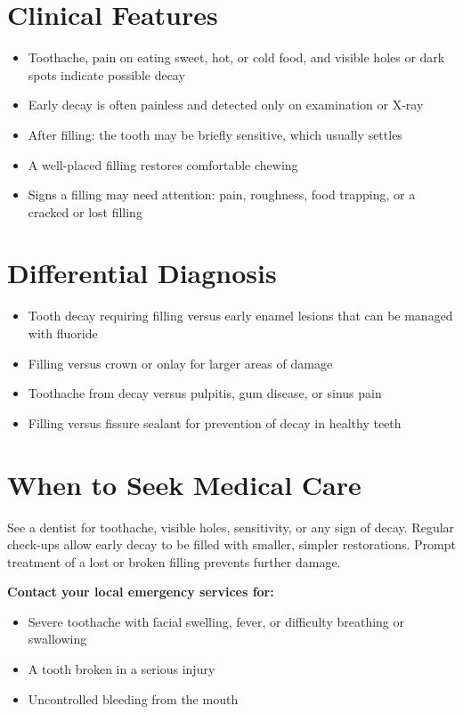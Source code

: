 \section*{Clinical Features}
\begin{itemize}
    \item Toothache, pain on eating sweet, hot, or cold food, and visible holes or dark spots indicate possible decay
    \item Early decay is often painless and detected only on examination or X-ray
    \item After filling: the tooth may be briefly sensitive, which usually settles
    \item A well-placed filling restores comfortable chewing
    \item Signs a filling may need attention: pain, roughness, food trapping, or a cracked or lost filling
\end{itemize}

\section*{Differential Diagnosis}
\begin{itemize}
    \item Tooth decay requiring filling versus early enamel lesions that can be managed with fluoride
    \item Filling versus crown or onlay for larger areas of damage
    \item Toothache from decay versus pulpitis, gum disease, or sinus pain
    \item Filling versus fissure sealant for prevention of decay in healthy teeth
\end{itemize}

\section*{When to Seek Medical Care}
See a dentist for toothache, visible holes, sensitivity, or any sign of decay. Regular check-ups allow early decay to be filled with smaller, simpler restorations. Prompt treatment of a lost or broken filling prevents further damage.

\textbf{Contact your local emergency services for:}
\begin{itemize}
    \item Severe toothache with facial swelling, fever, or difficulty breathing or swallowing
    \item A tooth broken in a serious injury
    \item Uncontrolled bleeding from the mouth
\end{itemize}

